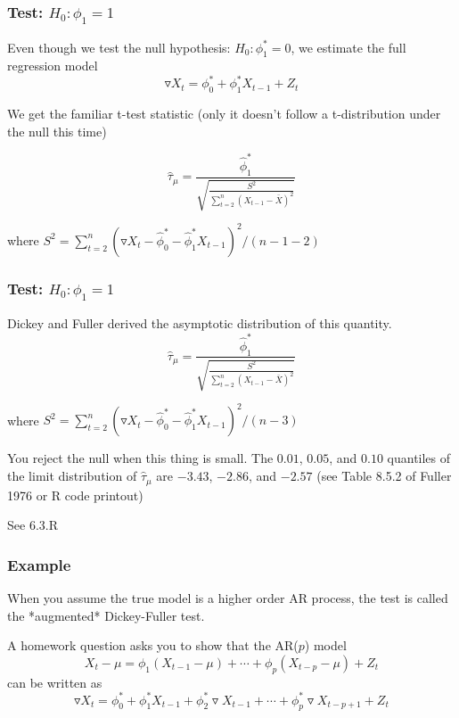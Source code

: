 \documentclass{beamer}
\begin{document}

\begin{frame}
\frametitle{Test: $H_0: \phi_1 = 1$}

Even though we test the null hypothesis: $H_0: \phi^*_1 = 0$, we estimate the full regression model
\[
\triangledown X_t = \phi^*_0 + \phi^*_1 X_{t-1} + Z_t
\]

We get the familiar t-test statistic (only it doesn't follow a t-distribution under the null this time)

\[
\hat{\tau}_{\mu} = \frac{\hat{\phi}_1^* }{ \sqrt{\frac{S^2}{\sum_{t=2}^n(X_{t-1}-\bar{X})^2 } } }
\]

where $S^2 = \sum_{t=2}^n (\triangledown X_t - \hat{\phi}^*_0 - \hat{\phi}_1^* X_{t-1})^2/(n-1 - 2)$

\end{frame}


\begin{frame}
\frametitle{Test: $H_0: \phi_1 = 1$}

Dickey and Fuller derived the asymptotic distribution of this quantity. 
\[
\hat{\tau}_{\mu} = \frac{\hat{\phi}_1^* }{ \sqrt{\frac{S^2}{\sum_{t=2}^n(X_{t-1}-\bar{X})^2 } } }
\]

where $S^2 = \sum_{t=2}^n (\triangledown X_t - \hat{\phi}^*_0 - \hat{\phi}_1^* X_{t-1})^2/(n-3)$
\newline

You reject the null when this thing is small. The $0.01$, $0.05$, and $0.10$ quantiles of the limit
distribution of $\hat{\tau}_{\mu}$ are $-3.43$, $-2.86$, and $-2.57$ (see Table 8.5.2 of Fuller 1976 or R code printout)
\newline

See 6.3.R

\end{frame}
\begin{frame}
\frametitle{Example}

When you assume the true model is a higher order AR process, the test is called the *augmented* Dickey-Fuller test.
\newline

A homework question asks you to show that the AR($p$) model 
\[
X_t - \mu  = \phi_1 (X_{t-1} - \mu ) + \cdots + \phi_p(X_{t-p} - \mu ) + Z_t
\]
can be written as
\[
\triangledown X_t = \phi_0^* + \phi_1^* X_{t-1} + \phi_2^*\triangledown X_{t-1} + \cdots + \phi_p^*\triangledown X_{t-p+1} + Z_t
\]

\end{frame}
\end{document}
